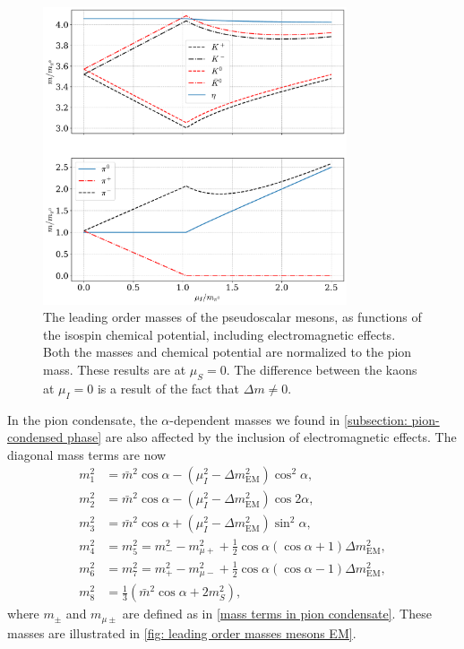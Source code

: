\begin{figure}
    \centering
    \includegraphics[width=0.8\textwidth]{../scripts/figurer/masses_mesons_EM.pdf}
    \caption{
        The leading order masses of the pseudoscalar mesons, as functions of the isospin chemical potential, including electromagnetic effects.
        Both the masses and chemical potential are normalized to the pion mass.
        These results are at $\mu_S = 0$.
        The difference between the kaons at $\mu_I = 0$ is a result of the fact that $\Delta m \neq 0$.
        }
    \label{fig: leading order masses mesons EM}
\end{figure}


In the pion condensate, the $\alpha$-dependent masses we found in \autoref{subsection: pion-condensed phase} are also affected by the inclusion of electromagnetic effects.
The diagonal mass terms are now 
%
\begingroup
\allowdisplaybreaks
\begin{align}
    m_1^2 &=  \bar m^2\cos\alpha - (\mu_I^2 - \Delta m_\text{EM}^2) \cos^2\alpha,\\
    m_2^2 &= \bar m^2\cos\alpha - (\mu_I^2  - \Delta m_\text{EM}^2)\cos2\alpha, \\
    m_3^2 &= \bar m^2\cos\alpha + (\mu_I^2  - \Delta m_\text{EM}^2)\sin^2\alpha, \\
    m_4^2 &= m_5^2 = m_-^2 - m_{\mu+}^2 + \frac{1}{2}\cos\alpha(\cos\alpha + 1) \Delta m_\text{EM}^2 , \\
    m_6^2 &= m_7^2 = m_+^2 - m^2_{\mu-} + \frac{1}{2}\cos\alpha(\cos\alpha - 1) \Delta m_\text{EM}^2, \\
    m_8^2 &= \frac{1}{3} (\bar m^2 \cos\alpha + 2 m_S^2),
\end{align}
\endgroup
%
where $m_\pm$ and $m_{\mu \pm}$ are defined as in \autoref{mass terms in pion condensate}.
These masses are illustrated in \autoref{fig: leading order masses mesons EM}.
